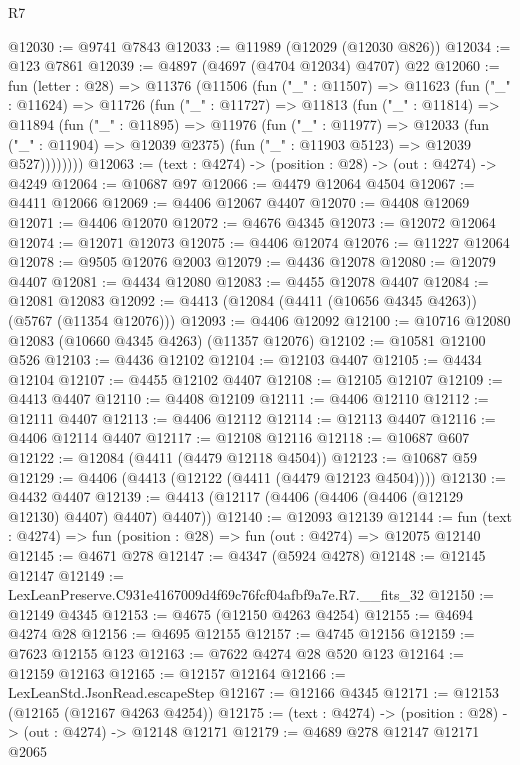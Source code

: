 \begin{lexlean}{R7}
\begin{coremodule}
@12030 := @9741 @7843
@12033 := @11989 (@12029 (@12030 @826))
@12034 := @123 @7861
@12039 := @4897 (@4697 (@4704 @12034) @4707) @22
@12060 := fun (letter : @28) =>
  @11376
    (@11506
      (fun ("_" : @11507) =>
      @11623
        (fun ("_" : @11624) =>
        @11726
          (fun ("_" : @11727) =>
          @11813
            (fun ("_" : @11814) =>
            @11894
              (fun ("_" : @11895) =>
              @11976
                (fun ("_" : @11977) =>
                @12033
                  (fun ("_" : @11904) => @12039 @2375)
                  (fun ("_" : @11903 @5123) => @12039 @527))))))))
@12063 := (text : @4274) -> (position : @28) -> (out : @4274) -> @4249
@12064 := @10687 @97
@12066 := @4479 @12064 @4504
@12067 := @4411 @12066
@12069 := @4406 @12067 @4407
@12070 := @4408 @12069
@12071 := @4406 @12070
@12072 := @4676 @4345
@12073 := @12072 @12064
@12074 := @12071 @12073
@12075 := @4406 @12074
@12076 := @11227 @12064
@12078 := @9505 @12076 @2003
@12079 := @4436 @12078
@12080 := @12079 @4407
@12081 := @4434 @12080
@12083 := @4455 @12078 @4407
@12084 := @12081 @12083
@12092 := @4413 (@12084 (@4411 (@10656 @4345 @4263)) (@5767 (@11354 @12076)))
@12093 := @4406 @12092
@12100 := @10716 @12080 @12083 (@10660 @4345 @4263) (@11357 @12076)
@12102 := @10581 @12100 @526
@12103 := @4436 @12102
@12104 := @12103 @4407
@12105 := @4434 @12104
@12107 := @4455 @12102 @4407
@12108 := @12105 @12107
@12109 := @4413 @4407
@12110 := @4408 @12109
@12111 := @4406 @12110
@12112 := @12111 @4407
@12113 := @4406 @12112
@12114 := @12113 @4407
@12116 := @4406 @12114 @4407
@12117 := @12108 @12116
@12118 := @10687 @607
@12122 := @12084 (@4411 (@4479 @12118 @4504))
@12123 := @10687 @59
@12129 := @4406 (@4413 (@12122 (@4411 (@4479 @12123 @4504))))
@12130 := @4432 @4407
@12139 := @4413 (@12117 (@4406 (@4406 (@4406 (@12129 @12130) @4407) @4407) @4407))
@12140 := @12093 @12139
@12144 := fun (text : @4274) => fun (position : @28) => fun (out : @4274) => @12075 @12140
@12145 := @4671 @278
@12147 := @4347 (@5924 @4278)
@12148 := @12145 @12147
@12149 := LexLeanPreserve.C931e4167009d4f69c76fcf04afbf9a7e.R7.__fits_32
@12150 := @12149 @4345
@12153 := @4675 (@12150 @4263 @4254)
@12155 := @4694 @4274 @28
@12156 := @4695 @12155
@12157 := @4745 @12156
@12159 := @7623 @12155 @123
@12163 := @7622 @4274 @28 @520 @123
@12164 := @12159 @12163
@12165 := @12157 @12164
@12166 := LexLeanStd.JsonRead.escapeStep
@12167 := @12166 @4345
@12171 := @12153 (@12165 (@12167 @4263 @4254))
@12175 := (text : @4274) -> (position : @28) -> (out : @4274) -> @12148 @12171
@12179 := @4689 @278 @12147 @12171 @2065

\end{coremodule}
\end{lexlean}
